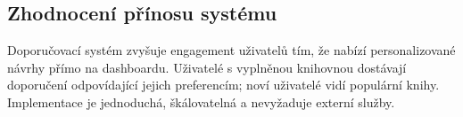 \subsection{Zhodnocení přínosu systému}
Doporučovací systém zvyšuje engagement uživatelů tím, že nabízí personalizované návrhy přímo na dashboardu. Uživatelé s vyplněnou knihovnou dostávají doporučení odpovídající jejich preferencím; noví uživatelé vidí populární knihy. Implementace je jednoduchá, škálovatelná a nevyžaduje externí služby.



